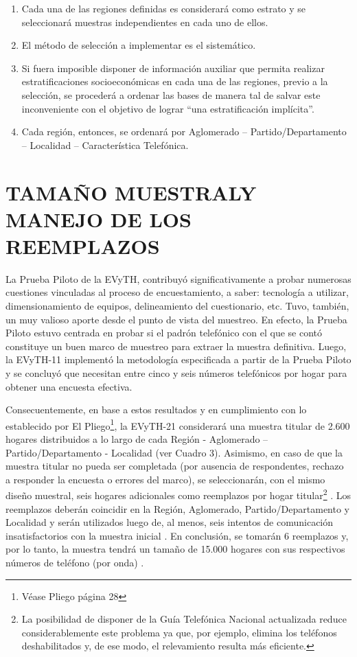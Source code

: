 \documentclass[
  openany]{book}
\providecommand{\tightlist}{%
  \setlength{\itemsep}{0pt}\setlength{\parskip}{0pt}}
\begin{document}
\begin{enumerate}
\def\labelenumi{\arabic{enumi})}
\tightlist
\item
  Cada una de las regiones definidas es considerará como estrato y se seleccionará muestras independientes en cada uno de ellos.
\item
  El método de selección a implementar es el sistemático.
\item
  Si fuera imposible disponer de información auxiliar que permita realizar estratificaciones socioeconómicas en cada una de las regiones, previo a la selección, se procederá a ordenar las bases de manera tal de salvar este inconveniente con el objetivo de lograr ``una estratificación implícita''.
\item
  Cada región, entonces, se ordenará por Aglomerado -- Partido/Departamento -- Localidad -- Característica Telefónica.
\end{enumerate}

\hypertarget{tamauxf1o-muestraly-manejo-de-los-reemplazos}{%
\section{\texorpdfstring{\textbf{TAMAÑO MUESTRALY MANEJO DE LOS REEMPLAZOS}}{TAMAÑO MUESTRALY MANEJO DE LOS REEMPLAZOS}}\label{tamauxf1o-muestraly-manejo-de-los-reemplazos}}

La Prueba Piloto de la EVyTH, contribuyó significativamente a probar numerosas cuestiones vinculadas al proceso de encuestamiento, a saber: tecnología a utilizar, dimensionamiento de equipos, delineamiento del cuestionario, etc.
Tuvo, también, un muy valioso aporte desde el punto de vista del muestreo.
En efecto, la Prueba Piloto estuvo centrada en probar si el padrón telefónico con el que se contó constituye un buen marco de muestreo para extraer la muestra definitiva.
Luego, la EVyTH-11 implementó la metodología especificada a partir de la Prueba Piloto y se concluyó que necesitan entre cinco y seis números telefónicos por hogar para obtener una encuesta efectiva.

Consecuentemente, en base a estos resultados y en cumplimiento con lo establecido por El Pliego\footnote{Véase Pliego página 28}, la EVyTH-21 considerará una muestra titular de 2.600 hogares distribuidos a lo largo de cada Región - Aglomerado -- Partido/Departamento - Localidad (ver Cuadro 3).
Asimismo, en caso de que la muestra titular no pueda ser completada (por ausencia de respondentes, rechazo a responder la encuesta o errores del marco), se seleccionarán, con el mismo diseño muestral, seis hogares adicionales como reemplazos por hogar titular\footnote{La posibilidad de disponer de la Guía Telefónica Nacional actualizada reduce considerablemente este problema ya que, por ejemplo, elimina los teléfonos deshabilitados y, de ese modo, el relevamiento resulta más eficiente.}
. Los reemplazos deberán coincidir en la Región, Aglomerado, Partido/Departamento y Localidad y serán utilizados luego de, al menos, seis intentos de comunicación insatisfactorios con la muestra inicial
. En conclusión, se tomarán 6 reemplazos y, por lo tanto, la muestra tendrá un tamaño de 15.000 hogares con sus respectivos números de teléfono (por onda)
.
\end{document}
